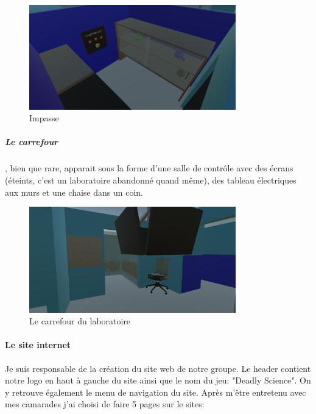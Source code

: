 \documentclass{article}
\begin{document}
\begin{figure}[!ht]
    \centering
    \includegraphics[width=0.8\textwidth]{impasse.png}
    \caption{Impasse}
    \label{Impasse}
\end{figure}

\newpage
\subparagraph{Le carrefour}\hspace{-0.2cm}, bien que rare, apparait sous la forme d'une salle de contrôle avec des écrans (éteints, c'est un laboratoire abandonné quand même), des tableau électriques aux murs et une chaise dans un coin.

\begin{figure}[!ht]
    \centering
    \includegraphics[width=0.8\textwidth]{carrefour.png}
    \caption{Le carrefour du laboratoire}
    \label{carrefour}
\end{figure}

\paragraph{Le site internet}
Je suis responsable de la création du site web de notre groupe. Le header contient notre logo en haut à gauche du site ainsi que le nom du jeu: "Deadly Science". On y retrouve également le menu de navigation du site. Après m'être entretenu avec mes camarades j'ai choisi de faire 5 pages sur le sites:
\end{document}
